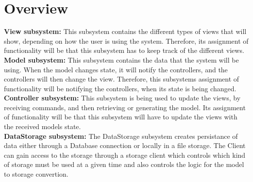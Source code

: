 \section{Overview}
\textbf{View subsystem:}
This subsystem contains the different types of views that will show, depending on how the user is 
using the system. Therefore, its assignment of functionality will be that this subsystem 
has to keep track of the different views.\\

\textbf{Model subsystem:}
This subsystem contains the data that the system will be using. When the model changes state, 
it will notify the controllers, and the controllers will then change the view. Therefore, 
this subsystems assignment of functionality will be notifying the controllers, 
when its state is being changed.\\

\textbf{Controller subsystem:}
This subsystem is being used to update the views, by receiving commands, and then retrieving or generating the model. 
Its assignment of functionality will be that this subsystem will have to update the views 
with the received models state.\\

\textbf{DataStorage subsystem:}
The DataStorage subsystem creates persistance of data either through a Database connection or locally in a file storage. The Client can gain access to the storage through a storage client which controls which kind of storage must be used at a given time and also controls the logic for the model to storage convertion. 

